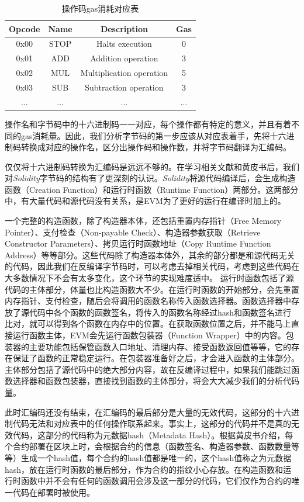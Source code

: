 \begin{table}
  \centering\small
  \caption{操作码gas消耗对应表}
    \begin{tabular}{cccc}
      \toprule
      Opcode & Name & Description & Gas \\
      \midrule
      0x00 & STOP & Halts execution & 0 \\
      0x01 & ADD & Addition operation & 3 \\
      0x02 & MUL & Multiplication operation & 5 \\
      0x03 & SUB & Subtraction operation & 3 \\
      ... & ... & ... & ... \\
      \bottomrule
    \end{tabular}
  \label{tab:opcode_gas}
\end{table}

操作名和字节码中的十六进制码一一对应，每个操作都有特定的意义，并且有着不同的gas消耗量。因此，我们分析字节码的第一步应该从对应表着手，先将十六进制码转换成对应的操作名，区分出操作码和操作数，并将字节码翻译为汇编码。

仅仅将十六进制码转换为汇编码是远远不够的。在学习相关文献和黄皮书后，我们对\emph{Solidity}字节码的结构有了更深刻的认识。\emph{Solidity}将源代码编译后，会生成构造函数（Creation Function）和运行时函数（Runtime Function）两部分。这两部分中，有大量代码和源代码没有关系，是EVM为了更好的运行在编译时加上的。

一个完整的构造函数，除了构造器本体，还包括重置内存指针（Free Memory Pointer）、支付检查（Non-payable Check）、构造器参数获取（Retrieve Constructor Parameters）、拷贝运行时函数地址（Copy Runtime Function Address）等等部分。这些代码除了构造器本体外，其余的部分都是和源代码无关的代码，因此我们在反编译字节码时，可以考虑去掉相关代码，考虑到这些代码在大多数情况下不会有太多变化，这个环节的实现难度适中。
运行时函数包括了源代码的主体部分，体量也比构造函数大不少。在运行时函数的开始部分，会先重置内存指针、支付检查，随后会将调用的函数名称传入函数选择器。函数选择器中存放了源代码中各个函数的函数签名，将传入的函数名称经过hash和函数签名进行比对，就可以得到各个函数在内存中的位置。在获取函数位置之后，并不能马上直接运行函数主体，EVM会先运行函数包装器（Function Wrapper）中的内容。包装器的主要功能包括保管函数入口地址、清理内存、接受函数返回值等等，它的存在保证了函数的正常稳定运行。在包装器准备好之后，才会进入函数的主体部分。主体部分包括了源代码中的绝大部分内容，故在反编译过程中，如果我们能跳过函数选择器和函数包装器，直接找到函数的主体部分，将会大大减少我们的分析代码量。

此时汇编码还没有结束，在汇编码的最后部分是大量的无效代码，这部分的十六进制代码无法和对应表中的任何操作联系起来。事实上，这部分的代码并不是真的无效代码，这部分的代码称为元数据hash（Metadata Hash）。根据黄皮书介绍，每个合约部署在区块上时，会根据合约的信息（函数签名、构造器参数、函数数量等等）生成一个hash值，每个合约的hash值都是唯一的，这个hash值称之为元数据hash，放在运行时函数的最后部分，作为合约的指纹小心存放。在构造函数和运行时函数中并不会有任何的函数调用会涉及这一部分的代码，它们仅作为合约的唯一代码在部署时被使用。
